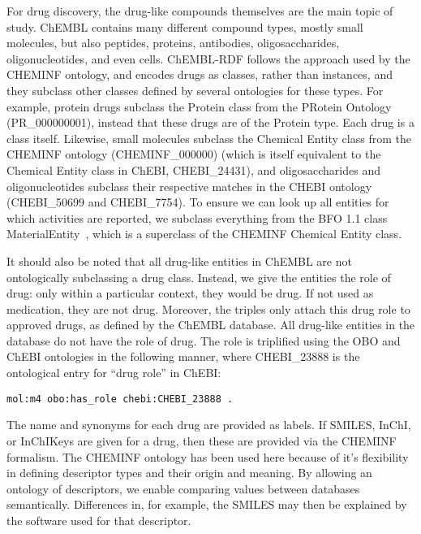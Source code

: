 \documentclass[10pt]{bmc_article}
\newenvironment{bmcformat}{\begin{raggedright}\baselineskip20pt\sloppy\setboolean{publ}{false}}{\end{raggedright}\baselineskip20pt\sloppy}
\begin{document}
\begin{bmcformat}
For drug discovery, the drug-like compounds themselves are the main topic of study.
ChEMBL contains many different compound types, mostly small molecules,
but also peptides, proteins, antibodies, oligosaccharides, oligonucleotides, and
even cells. ChEMBL-RDF follows the approach used by the CHEMINF ontology,
and encodes drugs as classes, rather than instances, and they subclass
other classes defined by several ontologies for these types. For example, protein drugs subclass the
Protein class from the PRotein Ontology (PR\_000000001), instead that these drugs are
of the Protein type. Each drug is a class itself. Likewise, small
molecules subclass the Chemical Entity class from the CHEMINF
ontology (CHEMINF\_000000) (which is itself equivalent to the Chemical Entity class in ChEBI, CHEBI\_24431), 
and oligosaccharides and oligonucleotides
subclass their respective matches in the CHEBI ontology (CHEBI\_50699
and CHEBI\_7754). To ensure we can look up all entities for which activities
are reported, we subclass everything from the BFO 1.1 class MaterialEntity~\cite{Smith2004},
which is a superclass of the CHEMINF Chemical Entity class.

It should also be noted that all drug-like entities in ChEMBL are not ontologically
subclassing a drug class. Instead, we give the entities the role of drug: only within a
particular context, they would be drug. If not used as medication, they are not drug.
Moreover, the triples only attach this drug role to approved drugs, as defined by the
ChEMBL database. All drug-like entities in the database do not have the role of drug.
The role is triplified using the OBO and ChEBI ontologies in the following manner,
where CHEBI\_23888 is the ontological entry for ``drug role'' in ChEBI:

\begin{small}
\begin{verbatim}
mol:m4 obo:has_role chebi:CHEBI_23888 .
\end{verbatim}
\end{small}

The name and synonyms for each drug are
provided as labels. If SMILES, InChI, or InChIKeys are given for a drug, then these are
provided via the CHEMINF formalism.
The CHEMINF ontology has been used here because of it's flexibility in defining
descriptor types and their origin and meaning. By allowing an ontology of descriptors,
we enable comparing values between databases semantically. Differences in, for example,
the SMILES may then be explained by the software used for that descriptor.


\end{bmcformat}
\end{document}
